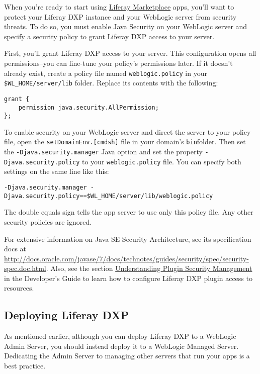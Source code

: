 When you're ready to start using
\href{https://web.liferay.com/marketplace}{Liferay Marketplace} apps,
you'll want to protect your Liferay DXP instance and your WebLogic
server from security threats. To do so, you must enable Java Security on
your WebLogic server and specify a security policy to grant Liferay DXP
access to your server.

First, you'll grant Liferay DXP access to your server. This
configuration opens all permissions--you can fine-tune your policy's
permissions later. If it doesn't already exist, create a policy file
named \texttt{weblogic.policy} in your \texttt{\$WL\_HOME/server/lib}
folder. Replace its contents with the following:

\begin{verbatim}
grant {
    permission java.security.AllPermission;
};
\end{verbatim}

To enable security on your WebLogic server and direct the server to your
policy file, open the \texttt{setDomainEnv.{[}cmd\textbar{}sh{]}} file
in your domain's \texttt{bin}folder. Then set the
\texttt{-Djava.security.manager} Java option and set the property
\texttt{-Djava.security.policy} to your \texttt{weblogic.policy} file.
You can specify both settings on the same line like this:

\begin{verbatim}
-Djava.security.manager -Djava.security.policy==$WL_HOME/server/lib/weblogic.policy
\end{verbatim}

The double equals sign tells the app server to use only this policy
file. Any other security policies are ignored.

For extensive information on Java SE Security Architecture, see its
specification docs at
\url{http://docs.oracle.com/javase/7/docs/technotes/guides/security/spec/security-spec.doc.html}.
Also, see the section
\href{https://www.liferay.com/documentation/liferay-portal/6.2/development/-/ai/understanding-plugin-security-management-liferay-portal-6-2-dev-guide-11-en}{Understanding
Plugin Security Management} in the Developer's Guide to learn how to
configure Liferay DXP plugin access to resources.

\subsection{Deploying Liferay DXP}\label{deploying-liferay-dxp-3}

As mentioned earlier, although you can deploy Liferay DXP to a WebLogic
Admin Server, you should instead deploy it to a WebLogic Managed Server.
Dedicating the Admin Server to managing other servers that run your apps
is a best practice.

